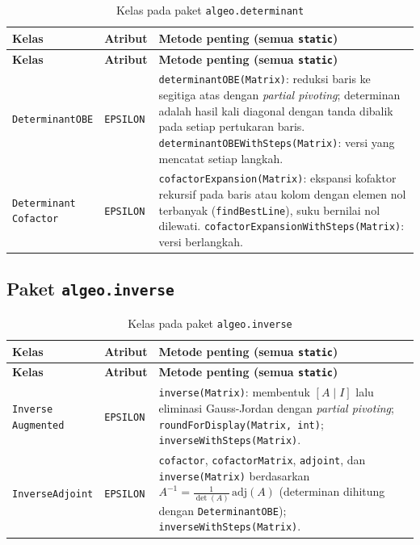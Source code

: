 \documentclass[12pt,a4paper]{report}
\begin{document}
\begin{longtable}{L{3.3cm} L{2.5cm} L{8.7cm}}
\caption{Kelas pada paket \texttt{algeo.determinant}}\label{tab:kelas-det}\\
\toprule
\textbf{Kelas} & \textbf{Atribut} & \textbf{Metode penting (semua \texttt{static})} \\
\midrule
\endfirsthead
\toprule
\textbf{Kelas} & \textbf{Atribut} & \textbf{Metode penting (semua \texttt{static})} \\
\midrule
\endhead
\bottomrule
\endfoot
\texttt{DeterminantOBE} & \texttt{EPSILON} &
\texttt{determinantOBE(Matrix)}: reduksi baris ke segitiga atas dengan
\textit{partial pivoting}; determinan adalah hasil kali diagonal dengan tanda
dibalik pada setiap pertukaran baris.
\texttt{determinantOBEWithSteps(Matrix)}: versi yang mencatat setiap langkah. \\
\addlinespace
\texttt{Determinant \newline Cofactor} & \texttt{EPSILON} &
\texttt{cofactorExpansion(Matrix)}: ekspansi kofaktor rekursif pada baris atau
kolom dengan elemen nol terbanyak (\texttt{findBestLine}), suku bernilai nol
dilewati. \texttt{cofactorExpansionWithSteps(Matrix)}: versi berlangkah. \\
\end{longtable}

\subsection{Paket \texttt{algeo.inverse}}

\begin{longtable}{L{3.3cm} L{2.5cm} L{8.7cm}}
\caption{Kelas pada paket \texttt{algeo.inverse}}\label{tab:kelas-inv}\\
\toprule
\textbf{Kelas} & \textbf{Atribut} & \textbf{Metode penting (semua \texttt{static})} \\
\midrule
\endfirsthead
\toprule
\textbf{Kelas} & \textbf{Atribut} & \textbf{Metode penting (semua \texttt{static})} \\
\midrule
\endhead
\bottomrule
\endfoot
\texttt{Inverse \newline Augmented} & \texttt{EPSILON} &
\texttt{inverse(Matrix)}: membentuk $[A \mid I]$ lalu eliminasi Gauss-Jordan
dengan \textit{partial pivoting};
\texttt{roundForDisplay(Matrix, int)}; \texttt{inverseWithSteps(Matrix)}. \\
\addlinespace
\texttt{InverseAdjoint} & \texttt{EPSILON} &
\texttt{cofactor}, \texttt{cofactorMatrix}, \texttt{adjoint}, dan
\texttt{inverse(Matrix)} berdasarkan $A^{-1} = \frac{1}{\det(A)}\,\mathrm{adj}(A)$
(determinan dihitung dengan \texttt{DeterminantOBE});
\texttt{inverseWithSteps(Matrix)}. \\
\end{longtable}
\end{document}
